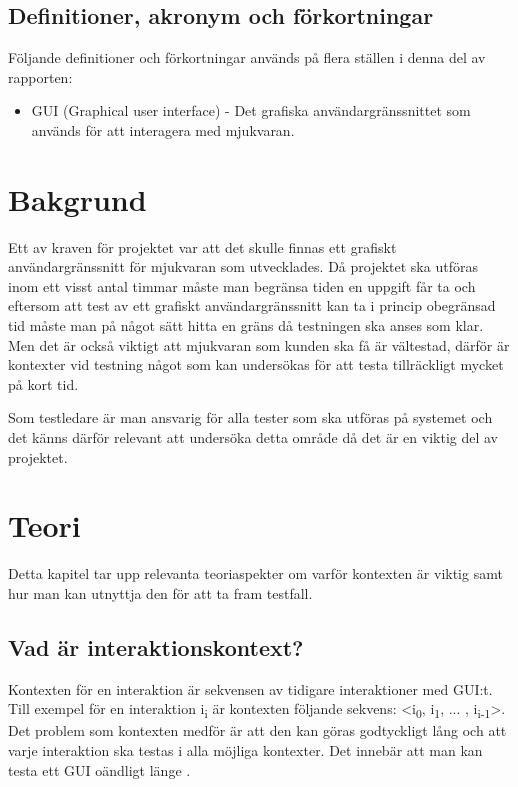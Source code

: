 \subsection{Definitioner, akronym och förkortningar}
Följande definitioner och förkortningar används på flera ställen i denna del av rapporten:
\begin{itemize}
	\item GUI (Graphical user interface) - Det grafiska användargränssnittet som används för att interagera med mjukvaran.
\end{itemize}

\section{Bakgrund}
\label{sec:background-holmberg}

Ett av kraven för projektet var att det skulle finnas ett grafiskt användargränssnitt för mjukvaran som utvecklades. Då projektet ska utföras inom ett visst antal timmar måste man begränsa tiden en uppgift får ta och eftersom att test av ett grafiskt användargränssnitt kan ta i princip obegränsad tid måste man på något sätt hitta en gräns då testningen ska anses som klar. Men det är också viktigt att mjukvaran som kunden ska få är vältestad, därför är kontexter vid testning något som kan undersökas för att testa tillräckligt mycket på kort tid.

Som testledare är man ansvarig för alla tester som ska utföras på systemet och det känns därför relevant att undersöka detta område då det är en viktig del av projektet.

\section{Teori}
\label{sec:theory-holmberg}

Detta kapitel tar upp relevanta teoriaspekter om varför kontexten är viktig samt hur man kan utnyttja den för att ta fram testfall.

\subsection{Vad är interaktionskontext?}

Kontexten för en interaktion är sekvensen av tidigare interaktioner med GUI:t. Till exempel för en interaktion i\textsubscript{i} är kontexten följande sekvens: <i\textsubscript{0}, i\textsubscript{1},  ... , i\textsubscript{i-1}>. Det problem som kontexten medför är att den kan göras godtyckligt lång och att varje interaktion ska testas i alla möjliga kontexter. Det innebär att man kan testa ett GUI oändligt länge \cite{yuan2011gui}. 

